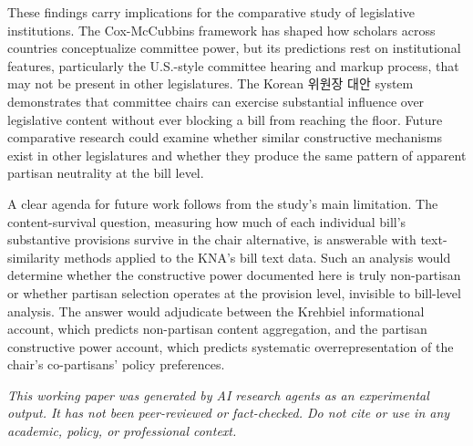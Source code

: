 \documentclass[11pt]{article}
\begin{document}
These findings carry implications for the comparative study of legislative institutions. The Cox-McCubbins framework has shaped how scholars across countries conceptualize committee power, but its predictions rest on institutional features, particularly the U.S.-style committee hearing and markup process, that may not be present in other legislatures. The Korean 위원장 대안 system demonstrates that committee chairs can exercise substantial influence over legislative content without ever blocking a bill from reaching the floor. Future comparative research could examine whether similar constructive mechanisms exist in other legislatures and whether they produce the same pattern of apparent partisan neutrality at the bill level.

A clear agenda for future work follows from the study's main limitation. The content-survival question, measuring how much of each individual bill's substantive provisions survive in the chair alternative, is answerable with text-similarity methods applied to the KNA's bill text data. Such an analysis would determine whether the constructive power documented here is truly non-partisan or whether partisan selection operates at the provision level, invisible to bill-level analysis. The answer would adjudicate between the Krehbiel informational account, which predicts non-partisan content aggregation, and the partisan constructive power account, which predicts systematic overrepresentation of the chair's co-partisans' policy preferences.

\bigskip
\noindent\textit{This working paper was generated by AI research agents as an
experimental output. It has not been peer-reviewed or fact-checked.
Do not cite or use in any academic, policy, or professional context.}



\end{document}
